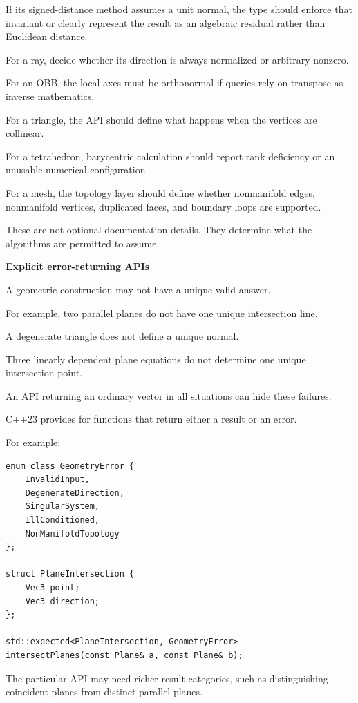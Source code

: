 If its signed-distance method assumes a unit normal, the type should enforce that invariant or clearly represent the result as an algebraic residual rather than Euclidean distance.

For a ray, decide whether its direction is always normalized or arbitrary nonzero.

For an OBB, the local axes must be orthonormal if queries rely on transpose-as-inverse mathematics.

For a triangle, the API should define what happens when the vertices are collinear.

For a tetrahedron, barycentric calculation should report rank deficiency or an unusable numerical configuration.

For a mesh, the topology layer should define whether nonmanifold edges, nonmanifold vertices, duplicated faces, and boundary loops are supported.

These are not optional documentation details. They determine what the algorithms are permitted to assume.

\textbf{Explicit error-returning APIs}

A geometric construction may not have a unique valid answer.

For example, two parallel planes do not have one unique intersection line.

A degenerate triangle does not define a unique normal.

Three linearly dependent plane equations do not determine one unique intersection point.

An API returning an ordinary vector in all situations can hide these failures.

C++23 provides  for functions that return either a result or an error.

For example:

\begin{verbatim}
enum class GeometryError {
    InvalidInput,
    DegenerateDirection,
    SingularSystem,
    IllConditioned,
    NonManifoldTopology
};

struct PlaneIntersection {
    Vec3 point;
    Vec3 direction;
};

std::expected<PlaneIntersection, GeometryError>
intersectPlanes(const Plane& a, const Plane& b);
\end{verbatim}

The particular API may need richer result categories, such as distinguishing coincident planes from distinct parallel planes.

